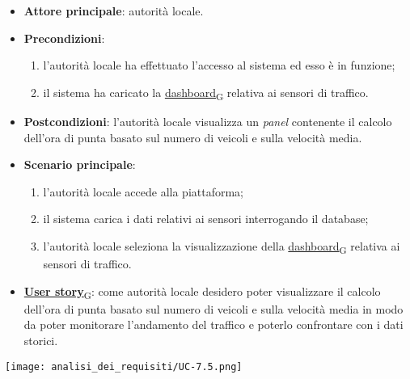 \begin{itemize}
	\item \textbf{Attore principale}: autorità locale.
	\item \textbf{Precondizioni}:
	      \begin{enumerate}
		      \item l'autorità locale ha effettuato l'accesso al sistema ed esso è in funzione;
		      \item il sistema ha caricato la \href{https://7last.github.io/docs/rtb/documentazione-interna/glossario\#dashboard}{dashboard\textsubscript{G}} relativa ai sensori di traffico.
	      \end{enumerate}
	\item \textbf{Postcondizioni}: l'autorità locale visualizza un \textit{panel} contenente il calcolo dell'ora di punta basato sul numero di veicoli e sulla velocità media.
	\item \textbf{Scenario principale}:
	      \begin{enumerate}
		      \item l'autorità locale accede alla piattaforma;
		      \item il sistema carica i dati relativi ai sensori interrogando il database;
		      \item l'autorità locale seleziona la visualizzazione della \href{https://7last.github.io/docs/rtb/documentazione-interna/glossario\#dashboard}{dashboard\textsubscript{G}} relativa ai sensori di traffico.
	      \end{enumerate}
	\item \href{https://7last.github.io/docs/rtb/documentazione-interna/glossario\#user-story}{\textbf{User story}\textsubscript{G}}:
	      come autorità locale desidero poter visualizzare il calcolo dell'ora di punta basato sul numero di veicoli e sulla velocità media in modo da poter monitorare
	      l'andamento del traffico e poterlo confrontare con i dati storici.
\end{itemize}
\begin{center}
	\texttt{[image: analisi\_dei\_requisiti/UC-7.5.png]}
\end{center}


